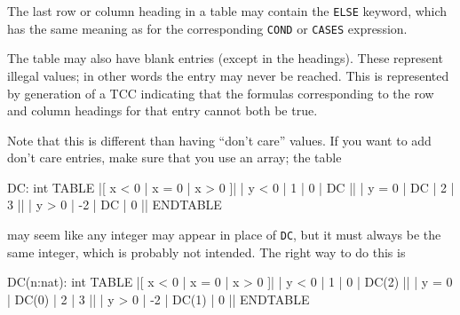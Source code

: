 The last row or column heading in a table may contain the \texttt{ELSE}
keyword, which has the same meaning as for the corresponding \texttt{COND}
or \texttt{CASES} expression.

The table may also have blank entries (except in the headings).  These
represent illegal values; in other words the entry may never be reached.
This is represented by generation of a TCC indicating that the
formulas corresponding to the row and column headings for that entry
cannot both be true.

Note that this is different than having ``don't care'' values.  If you
want to add don't care entries, make sure that you use an array; the table
\begin{pvsex}
DC: int
TABLE
         |[ x < 0 | x = 0 | x > 0 ]|
  | y < 0 |   1   |   0   |   DC  ||
  | y = 0 |  DC   |   2   |    3  ||
  | y > 0 |   -2  |  DC   |    0  ||
  ENDTABLE
\end{pvsex}
may seem like any integer may appear in place of \texttt{DC}, but it must
always be the same integer, which is probably not intended.  The right way
to do this is
\begin{pvsex}
DC(n:nat): int
TABLE
         |[ x < 0 | x = 0 | x > 0 ]|
  | y < 0 |   1   |   0   | DC(2) ||
  | y = 0 | DC(0) |   2   |    3  ||
  | y > 0 |   -2  | DC(1) |    0  ||
  ENDTABLE
\end{pvsex}

